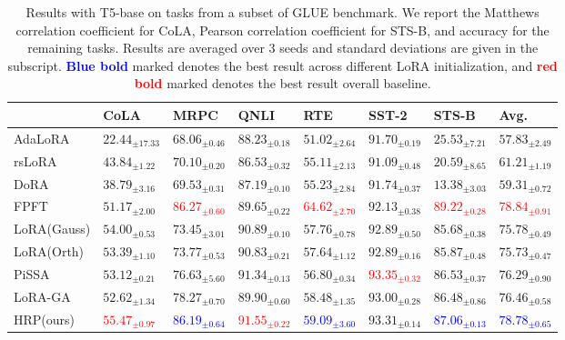 
\begin{table*}
\label{glue}
    \centering
    \caption{Results with T5-base on tasks from a subset of GLUE benchmark. We report the Matthews correlation coefficient for CoLA, Pearson correlation coefficient for STS-B, and accuracy for the remaining tasks. Results are averaged over 3 seeds and standard deviations are given in the subscript. \textcolor{blue}{\textbf{Blue bold}} marked denotes the best result across different LoRA initialization, and \textcolor{red}{\textbf{red bold}} marked denotes the best result overall baseline.}
\begin{tabular}{llllllll}
\toprule
 & CoLA & MRPC & QNLI & RTE & SST-2 & STS-B & Avg. \\
\midrule
AdaLoRA & $22.44_{\pm 17.33}$ & $68.06_{\pm 0.46}$ & $88.23_{\pm 0.18}$ & $51.02_{\pm 2.64}$ & $91.70_{\pm 0.19}$ & $25.53_{\pm 7.21}$ & $57.83_{\pm 2.49}$ \\
rsLoRA & $43.84_{\pm 1.22}$ & $70.10_{\pm 0.20}$ & $86.53_{\pm 0.32}$ & $55.11_{\pm 2.13}$ & $91.09_{\pm 0.48}$ & $20.59_{\pm 8.65}$ & $61.21_{\pm 1.19}$ \\
DoRA & $38.79_{\pm 3.16}$ & $69.53_{\pm 0.31}$ & $87.19_{\pm 0.10}$ & $55.23_{\pm 2.84}$ & $91.74_{\pm 0.37}$ & $13.38_{\pm 3.03}$ & $59.31_{\pm 0.72}$ \\
FPFT & $51.17_{\pm 2.00}$ & \textcolor{red}{$\mathbf{86.27_{\pm 0.60}}$} & $89.65_{\pm 0.22}$ & \textcolor{red}{$\mathbf{64.62_{\pm 2.70}}$} & $92.13_{\pm 0.38}$ & \textcolor{red}{$\mathbf{89.22_{\pm 0.28}}$} & \textcolor{red}{$\mathbf{78.84_{\pm 0.91}}$} \\\hline
LoRA(Gauss) & $54.00_{\pm 0.53}$ & $73.45_{\pm 3.01}$ & $90.89_{\pm 0.10}$ & $57.76_{\pm 0.78}$ & $92.89_{\pm 0.50}$ & $85.68_{\pm 0.38}$ & $75.78_{\pm 0.49}$ \\
LoRA(Orth) & $53.39_{\pm 1.10}$ & $73.77_{\pm 0.53}$ & $90.83_{\pm 0.21}$ & $57.64_{\pm 1.12}$ & $92.89_{\pm 0.16}$ & $85.87_{\pm 0.48}$ & $75.73_{\pm 0.47}$ \\
PiSSA & $53.12_{\pm 0.21}$ & $76.63_{\pm 5.60}$ & $91.34_{\pm 0.13}$ & $56.80_{\pm 0.34}$ & \textcolor{red}{$\mathbf{93.35_{\pm 0.32}}$} & $86.53_{\pm 0.37}$ & $76.29_{\pm 0.90}$ \\
LoRA-GA & $52.62_{\pm 1.34}$ & $78.27_{\pm 0.70}$ & $89.90_{\pm 0.60}$ & $58.48_{\pm 1.35}$ & $93.00_{\pm 0.28}$ & $86.48_{\pm 0.86}$ & $76.46_{\pm 0.58}$ \\
HRP(ours) & \textcolor{red}{$\mathbf{55.47_{\pm 0.97}}$} & \textcolor{blue}{$\mathbf{86.19_{\pm 0.64}}$} & \textcolor{red}{$\mathbf{91.55_{\pm 0.22}}$} & \textcolor{blue}{$\mathbf{59.09_{\pm 3.60}}$} & $93.31_{\pm 0.14}$ & \textcolor{blue}{$\mathbf{87.06_{\pm 0.13}}$} & \textcolor{blue}{$\mathbf{78.78_{\pm 0.65}}$} \\\hline

\end{tabular}
\end{table*}
